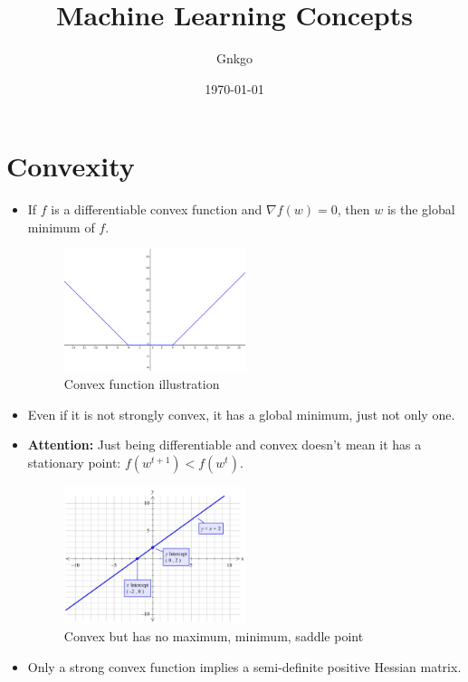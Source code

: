 \documentclass{article}
\begin{document}
\title{Machine Learning Concepts}
\author{Gnkgo}
\date{\today}

\maketitle

\clearpage

\tableofcontents

\clearpage
\section{Convexity}
\begin{itemize}
    \item If $f$ is a differentiable convex function and $\nabla f(w) = 0$, then $w$ is the global minimum of $f$.
    \begin{figure}[h]
        \centering
        \includegraphics[width=0.5\textwidth]{assets/convex.png}
        \caption{Convex function illustration}
    \end{figure}
    \item Even if it is not strongly convex, it has a global minimum, just not only one.
    \item \textbf{Attention:} Just being differentiable and convex doesn't mean it has a stationary point: $f(w^{t+1}) < f(w^t)$.
    \begin{figure}[h]
        \centering
        \includegraphics[width=0.5\textwidth]{assets/x.jpeg}
        \caption{Convex but has no maximum, minimum, saddle point}
    \end{figure}
    \item Only a strong convex function implies a semi-definite positive Hessian matrix.
\end{itemize}
\end{document}
